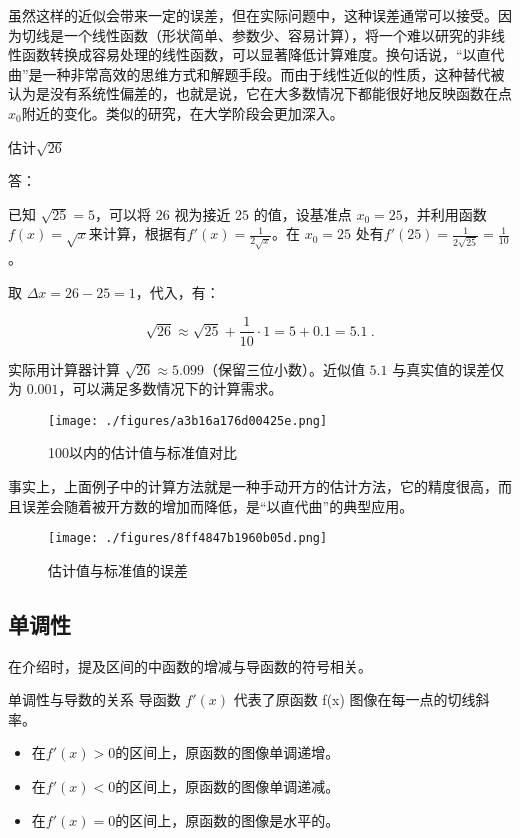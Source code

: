 虽然这样的近似会带来一定的误差，但在实际问题中，这种误差通常可以接受。因为切线是一个线性函数（形状简单、参数少、容易计算），将一个难以研究的非线性函数转换成容易处理的线性函数，可以显著降低计算难度。换句话说，“以直代曲”是一种非常高效的思维方式和解题手段。而由于线性近似的性质，这种替代被认为是没有系统性偏差的，也就是说，它在大多数情况下都能很好地反映函数在点$x_0$附近的变化。类似的研究，在大学阶段会更加深入。

\begin{example}{估计$\sqrt{26}$}

答：

已知 $\sqrt{25} = 5$，可以将 $26$ 视为接近 $25$ 的值，设基准点 $x_0 = 25$，并利用函数 $f(x) = \sqrt{x}$来计算，根据有$\displaystyle f'(x) = \frac{1}{2\sqrt{x}}$。在 $x_0 = 25$ 处有$\displaystyle f'(25) = \frac{1}{2\sqrt{25}} = \frac{1}{10}$。

取 $\Delta x = 26 - 25 = 1$，代入，有：

\begin{equation}
\sqrt{26} \approx \sqrt{25} + \frac{1}{10} \cdot 1 = 5 + 0.1 = 5.1~.
\end{equation}

实际用计算器计算 $\sqrt{26} \approx 5.099$（保留三位小数）。近似值 $5.1$ 与真实值的误差仅为 $0.001$，可以满足多数情况下的计算需求。
\end{example}

\begin{figure}[ht]
\centering
\texttt{[image: ./figures/a3b16a176d00425e.png]}
\caption{100以内的估计值与标准值对比} \label{fig_HsDerC_1}
\end{figure}

事实上，上面例子中的计算方法就是一种手动开方的估计方法，它的精度很高，而且误差会随着被开方数的增加而降低，是“以直代曲”的典型应用。

\begin{figure}[ht]
\centering
\texttt{[image: ./figures/8ff4847b1960b05d.png]}
\caption{估计值与标准值的误差} \label{fig_HsDerC_2}
\end{figure}

\subsection{单调性}

在介绍时，提及区间的中函数的增减与导函数的符号相关。

\begin{theorem}{单调性与导数的关系}
导函数  $f'(x)$  代表了原函数  f(x)  图像在每一点的切线斜率。
\begin{itemize}
\item 在$f'(x)>0$的区间上，原函数的图像单调递增。
\item 在$f'(x)<0$的区间上，原函数的图像单调递减。
\item 在$f'(x)=0$的区间上，原函数的图像是水平的。
\end{itemize}
\end{theorem}



